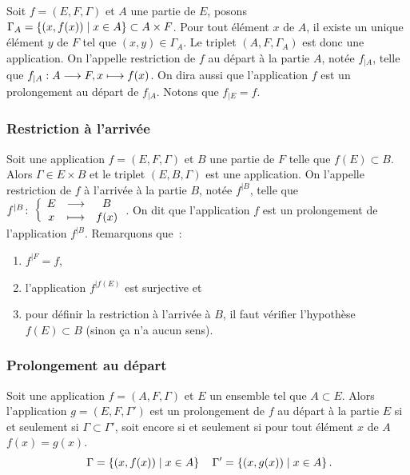 Soit \(f = (E, F, \Gamma)\) et \(A\) une partie de \(E\), posons 
\(\Gamma_A = \left\{(x, f(x))\mathrel{}\middle|\mathrel{}x \in A\right\} \subset A \times F\). Pour tout élément 
\(x\) de \(A\), il existe un unique élément \(y\) de \(F\) tel que \((x, y) \in 
\Gamma_A\). Le triplet \((A, F, \Gamma_A)\) est donc une application. On 
l'appelle restriction de \(f\) au départ à la partie \(A\), notée \(f_{|A}\), 
telle que \(f_{|A}:A \longrightarrow F, x \longmapsto f(x)\). On dira aussi que l'application 
\(f\) est un prolongement au départ de \(f_{|A}\). Notons que \(f_{|E} = f\).

\subsubsection{Restriction à l'arrivée}
\label{chap3-subsubsec:restrictionarr}

Soit une application \(f = (E, F, \Gamma)\) et \(B\) une partie de \(F\) telle 
que \(f(E) \subset B\). Alors \(\Gamma \in E \times B\) et le triplet 
\((E, B, \Gamma)\) est une application. On l'appelle restriction de \(f\) à 
l'arrivée à la partie \(B\), notée \(f^{|B}\), telle que 
\(f^{|B}\colon \left\{\begin{array}{ccc} E & \longrightarrow &B\\ x & \longmapsto & f(x) \end{array} \right.\). On dit que l'application \(f\) est un 
prolongement de l'application \(f^{|B}\). Remarquons que~:
\begin{enumerate}
    \item \(f^{|F} = f\), 
    \item l'application \(f^{|f(E)}\) est surjective et 
    \item pour définir la restriction à l'arrivée à \(B\), il faut vérifier 
        l'hypothèse \(f(E) \subset B\) (sinon ça n'a aucun sens).
\end{enumerate}

\subsubsection{Prolongement au départ}
\label{chap3-subsubsec:prolongementdep}

Soit une application \(f = (A, F, \Gamma)\) et \(E\) un ensemble tel que \(A \subset 
E\). Alors l'application \(g = (E, F, \Gamma')\) est un prolongement de \(f\) au 
départ à la partie \(E\) si et seulement si \(\Gamma \subset \Gamma'\), soit 
encore si et seulement si pour tout élément \(x\) de \(A\) \(f(x) = g(x)\).
\begin{equation}\
    \Gamma = \left\{(x,f(x))\mathrel{}\middle|\mathrel{}x \in A\right\} \quad \Gamma' = \left\{(x,g(x))\mathrel{}\middle|\mathrel{}x \in A\right\}.
\end{equation}


